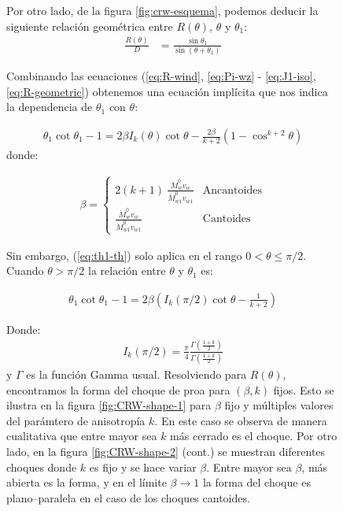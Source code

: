 \begin{figure}
Por otro lado, de la figura \ref{fig:crw-esquema}, podemos deducir la siguiente relación geométrica entre $R(\theta)$,
$\theta$ y $\theta_1$:
\begin{align}
  \frac{R(\theta)}{D} &= \frac{\sin\theta_1}{\sin(\theta+\theta_1)} \label{eq:R-geometric}
\end{align}

Combinando las ecuaciones (\ref{eq:R-wind}, \ref{eq:Pi-wz} - \ref{eq:J1-iso}, \ref{eq:R-geometric}) obtenemos una ecuación implícita que nos indica la dependencia de $\theta_1$ con $\theta$:

\begin{align}
  \theta_1\cot\theta_1 -1 = 2\beta I_k(\theta)\cot\theta - \frac{2\beta}{k+2}\left(1 - \cos^{k+2}\theta\right) \label{eq:th1-th} 
\end{align}
donde:

\begin{align}
  \beta = \left\lbrace
  \begin{array}{lr}
    2(k+1)~\frac{\dot{M}_w^0v_w}{\dot{M}_{w1}^0v_{w1}} & \mathrm{Ancantoides} \\
    \frac{\dot{M}_w^0v_w}{\dot{M}_{w1}^0v_{w1}} & \mathrm{Cantoides}
  \end{array}\right.
\end{align}


Sin embargo, (\ref{eq:th1-th}) solo aplica en el rango $0 < \theta \leq \pi/2$. Cuando $\theta > \pi/2$ la relación entre $\theta$ y $\theta_1$ es:

\begin{align}
  \theta_1\cot\theta_1 - 1 = 2\beta\left(I_k(\pi/2)\cot\theta - \frac{1}{k+2}\right) \label{eq:th1-th-far-wings}
\end{align}

Donde:
\begin{align}
I_k(\pi/2) = \frac{\pi}{4}\frac{\Gamma\left(\frac{1+k}{2}\right)}{\Gamma\left(\frac{4+k}{2}\right)} 
\end{align}
y $\Gamma$ es la función Gamma usual. Resolviendo para $R(\theta)$, encontramos la forma del choque de proa para $(\beta, k)$ fijos. Esto se ilustra en la figura \ref{fig:CRW-shape-1} para $\beta$ fijo y múltiples valores del parámtero de anisotropía $k$. En este caso se observa de manera cualitativa que entre mayor sea $k$ más cerrado es el choque. Por otro lado, en la figura \ref{fig:CRW-shape-2} (cont.) se muestran diferentes choques donde $k$ es fijo y se hace variar $\beta$. Entre mayor sea $\beta$, más abierta es la forma, y en el límite $\beta\to 1$ la forma del choque es plano--paralela en el caso de los choques cantoides.


\end{figure}
